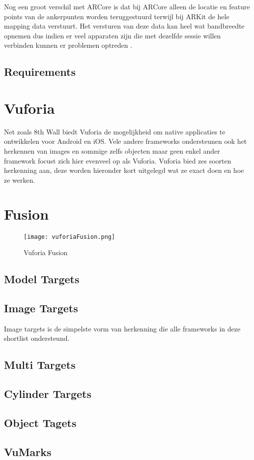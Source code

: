 Nog een groot verschil met ARCore is dat bij ARCore alleen de locatie en feature points van de ankerpunten worden teruggestuurd terwijl bij ARKit de hele mapping data verstuurt. Het versturen van deze data kan heel wat bandbreedte opnemen dus indien er veel apparaten zijn die met dezelfde sessie willen verbinden kunnen er problemen optreden \autocite{ARKitMultiuser}.

\subsection{Requirements}

\section{Vuforia}
Net zoals 8th Wall biedt Vuforia de mogelijkheid om native applicaties te ontwikkelen voor Android en iOS. Vele andere frameworks ondersteunen ook het herkennen van images en sommige zelfs objecten maar geen enkel ander framework focust zich hier evenveel op als Vuforia.  
Vuforia bied zes soorten herkenning aan, deze worden hieronder kort uitgelegd wat ze exact doen en hoe ze werken.

\section{Fusion}
\begin{figure}
    \texttt{[image: vuforiaFusion.png]}
    \caption{Vuforia Fusion}
    \label{fig:vuforiaFusion}
\end{figure}

\subsection{Model Targets}
\subsection{Image Targets}
Image targets is de simpelste vorm van herkenning die alle frameworks in deze shortlist ondersteund.
\subsection{Multi Targets}
\subsection{Cylinder Targets}
\subsection{Object Tagets}
\subsection{VuMarks}
